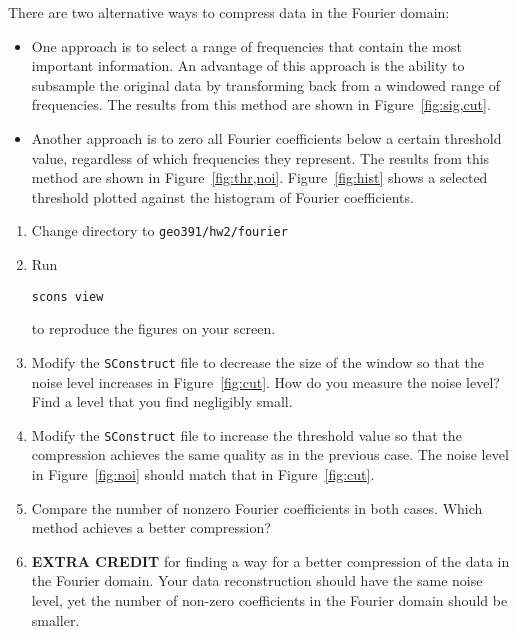 There are two alternative ways to compress data in the Fourier domain:
\begin{itemize}
\item One approach is to
select a range of frequencies that contain the most important
information. An advantage of this approach is the ability to subsample
the original data by transforming back from a windowed range of frequencies.
The results from this method are shown in Figure~\ref{fig:sig,cut}.
\item Another approach is to zero all Fourier coefficients below a certain threshold value, regardless of which frequencies they represent.  
 The results from this method are shown in Figure~\ref{fig:thr,noi}. Figure~\ref{fig:hist} shows a selected threshold plotted against the histogram of Fourier coefficients.
\end{itemize}



\begin{enumerate}
\item Change directory to \verb#geo391/hw2/fourier#
\item Run 
\begin{verbatim}
scons view
\end{verbatim}
to reproduce the figures on your screen.
\item Modify the \texttt{SConstruct} file to decrease the size of the window so that the noise level increases in Figure~\ref{fig:cut}. How do you measure the noise level? Find a level that you find negligibly small.
\item Modify the \texttt{SConstruct} file to increase the threshold value so that the compression achieves the same quality as in the previous case. The noise level in Figure~\ref{fig:noi} should match that in Figure~\ref{fig:cut}.
\item Compare the number of nonzero Fourier coefficients in both cases. Which method achieves a better compression?
\item \textbf{EXTRA CREDIT} for finding a way for a better compression of the data in the Fourier domain. Your data reconstruction should have 
the same noise level, yet the number of non-zero coefficients in the Fourier domain should be smaller.
\end{enumerate}

